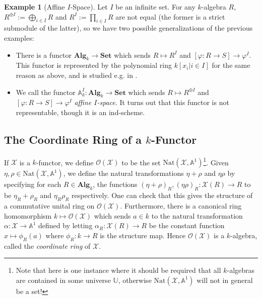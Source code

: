 \documentclass[oneside,11pt]{amsart}
\newcommand{\aaa}{\ensuremath{\mathbb{A}}}
\newcommand{\bSet}{\ensuremath{\textbf{Set}}}
\newcommand{\bAlg}{\ensuremath{\textbf{Alg}}}
\newcommand{\mX}{\ensuremath{\mathcal{X}}}
\newcommand{\sO}{\ensuremath{\mathscr{O}}}
\newcommand{\Nat}{\ensuremath{\text{Nat}}}
\theoremstyle{definition}
\newtheorem{example}{Example}
\newtheorem{proof techniques}{Proof Techniques}
\begin{document}
\begin{example}[Affine $I$-Space]
Let $I$ be an infinite set. For any $k$-algebra $R$, $R^{\oplus I} := \bigoplus_{i \in I} R$ and $R^I := \prod_{i \in I} R$ are not equal (the former is a strict submodule of the latter), so we have two possible generalizations of the previous examples: 
\

\begin{itemize}

\item There is a functor $\bAlg_k \to \bSet$ which sends $R \mapsto R^{I}$ and $[\varphi : R \to S ] \to  \varphi^I$. This functor is represented by the polynomial ring $k[x_i | i \in I ]$ for the same reason as above, and is studied e.g. in \cite{nagpal-snowden2021}.

\item We call the functor $\aaa^I_k : \bAlg_k \to \bSet$ which sends $R \mapsto R^{\oplus I}$ and $[\varphi : R \to S ] \to  \varphi^I$ \emph{affine $I$-space}. It turns out that this functor is not representable, though it is an ind-scheme.

\end{itemize}
\end{example}


\subsection{The Coordinate Ring of a $k$-Functor}

If $\mX$ is a $k$-functor, we define $\sO(\mX)$ to be the set $\Nat(\mX , \aaa^1)$\footnote{Note that here is one instance where it should be required that all $k$-algebras are contained in some universe $\mathbb{U}$, otherwise $\Nat(\mX , \aaa^1)$ will not in general be a set!}. Given $\eta , \rho \in \Nat(\mX , \aaa^1)$, we define the natural transformations $\eta + \rho$ and $\eta \rho$ by specifying for each $R \in \bAlg_k$, the functions $(\eta + \rho)_R, (\eta \rho)_R  : \mX(R) \to R$ to be $\eta_R + \rho_R$ and $\eta_R \rho_R$ respectively. One can check that this gives the structure of a commutative unital ring on $\sO(\mX)$. Furthermore, there is a canonical ring homomorphism $k \mapsto \sO(\mX)$ which sends $a \in k$ to the natural transformation $\alpha: \mX \to \aaa^1$ defined by letting $\alpha_R : \mX(R) \to R$ be the constant function $x \mapsto \phi_R(a)$ where $\phi_R : k \to R$ is the structure map. Hence $\sO(\mX)$ is a $k$-algebra, called the \emph{coordinate ring} of $\mX$. 
\end{document}

